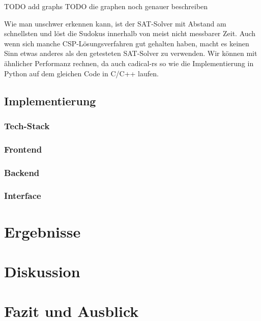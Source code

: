\documentclass[12pt,a4paper]{article}
\begin{document}
TODO add graphs
TODO die graphen noch genauer beschreiben

Wie man unschwer erkennen kann, ist der SAT-Solver mit Abstand am schnellsten und löst die Sudokus innerhalb von meist nicht messbarer Zeit.
Auch wenn sich manche CSP-Lösungsverfahren gut gehalten haben, macht es keinen Sinn etwas anderes als den getesteten SAT-Solver zu verwenden.
Wir können mit ähnlicher Performanz rechnen, da auch cadical-rs so wie die Implementierung in Python auf dem gleichen Code in C/C++ laufen.

\subsection{Implementierung}
\subsubsection{Tech-Stack}
\subsubsection{Frontend}
\subsubsection{Backend}
\subsubsection{Interface}

\section{Ergebnisse}

\section{Diskussion}

\section{Fazit und Ausblick}



\end{document}
